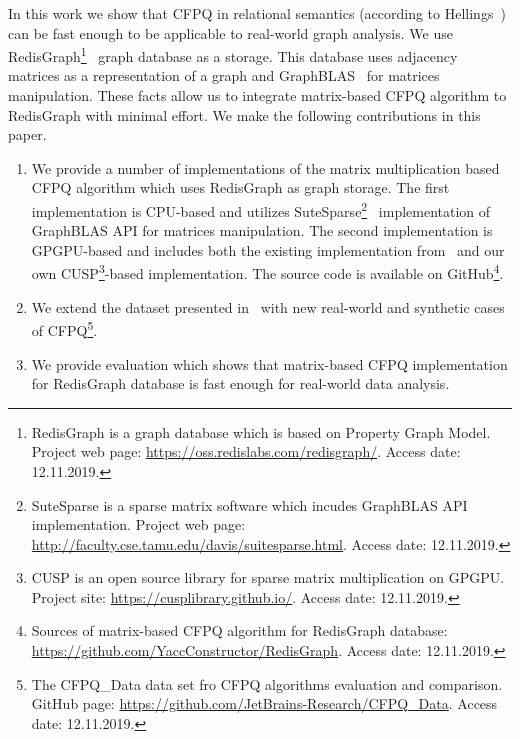 In this work we show that CFPQ in relational semantics (according to Hellings~\cite{hellingsRelational}) can be fast enough to be applicable to real-world graph analysis.
We use RedisGraph\footnote{RedisGraph is a graph database which is based on Property Graph Model. Project web page: \url{https://oss.redislabs.com/redisgraph/}. Access date: 12.11.2019.}~\cite{8778293} graph database as a storage.
This database uses adjacency matrices as a representation of a graph and GraphBLAS~\cite{7761646} for matrices manipulation.
These facts allow us to integrate matrix-based CFPQ algorithm to RedisGraph with minimal effort.
We make the following contributions in this paper.
\begin{enumerate}
\item We provide a number of implementations of the matrix multiplication based CFPQ algorithm which uses RedisGraph as graph storage.
The first implementation is CPU-based and utilizes SuteSparse\footnote{SuteSparse is a sparse matrix software which incudes GraphBLAS API implementation. Project web page: \url{http://faculty.cse.tamu.edu/davis/suitesparse.html}. Access date: 12.11.2019.}~\cite{Davis2018Algorithm9S} implementation of GraphBLAS API for matrices manipulation.
The second implementation is GPGPU-based and includes both the existing implementation from~\cite{Mishin:2019:ECP:3327964.3328503} and our own CUSP\footnote{CUSP is an open source library for sparse matrix multiplication on GPGPU. Project site: \url{https://cusplibrary.github.io/}. Access date: 12.11.2019.}-based implementation.
The source code is available on GitHub\footnote{Sources of matrix-based CFPQ algorithm for RedisGraph database: \url{https://github.com/YaccConstructor/RedisGraph}. Access date: 12.11.2019.}.
\item We extend the dataset presented in~\cite{Mishin:2019:ECP:3327964.3328503} with new real-world and synthetic cases of CFPQ\footnote{The CFPQ\_Data data set fro CFPQ algorithms evaluation and comparison. GitHub page: \url{https://github.com/JetBrains-Research/CFPQ_Data}. Access date: 12.11.2019.}.
\item We provide evaluation which shows that matrix-based CFPQ implementation for RedisGraph database is fast enough for real-world data analysis.
\end{enumerate}
